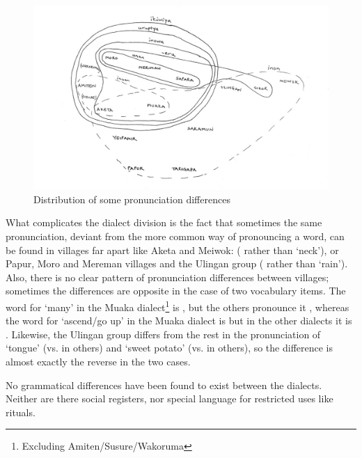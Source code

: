 \begin{figure}
\caption{Distribution of some pronunciation differences}
\label{map:1:prondistribution}
\includegraphics[width=\textwidth]{figures/1-distribution_of_some_pronounciation_differnces_map.jpeg}
\end{figure}

What complicates the dialect division is the fact that sometimes the same pronunciation, deviant from the more common way of pronouncing a word, can be found in villages far apart like Aketa and Meiwok: ( rather than  `neck'), or Papur,  Moro and Mereman villages and the Ulingan group ( rather than  `rain'). Also, there is no clear pattern of pronunciation differences between villages; sometimes the differences are opposite in the case of two vocabulary items. The word for `many' in the Muaka dialect\footnote{Excluding Amiten/Susure/Wakoruma} is , but the others pronounce it , whereas the word for `ascend/go up' in the Muaka dialect is \emphs but in the other dialects it is . Likewise, the Ulingan group differs from the rest in the pronunciation of  `tongue' (vs.  in others) and  `sweet potato' (vs.  in others), so the difference is almost exactly the reverse in the two cases.  

No grammatical differences have been found to exist between the dialects.  Neither are there social registers, nor special language for restricted uses like rituals. 

